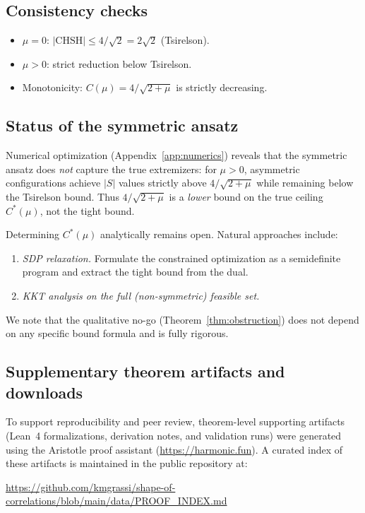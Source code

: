 \documentclass[11pt,a4paper]{article}
\theoremstyle{definition}
\theoremstyle{remark}
\newcommand{\CHSH}{\mathrm{CHSH}}
\begin{document}
\subsection{Consistency checks}

\begin{itemize}[nosep]
  \item $\mu = 0$: $|\CHSH| \le 4/\sqrt{2} = 2\sqrt{2}$ (Tsirelson).
  \item $\mu > 0$: strict reduction below Tsirelson.
  \item Monotonicity: $C(\mu) = 4/\sqrt{2+\mu}$ is strictly decreasing.
\end{itemize}

\subsection{Status of the symmetric ansatz}\label{app:paths}

Numerical optimization (Appendix~\ref{app:numerics}) reveals that the symmetric ansatz does \emph{not} capture the true extremizers: for $\mu > 0$, asymmetric configurations achieve $|S|$ values strictly above $4/\sqrt{2+\mu}$ while remaining below the Tsirelson bound. Thus $4/\sqrt{2+\mu}$ is a \emph{lower} bound on the true ceiling~$C^*(\mu)$, not the tight bound.

Determining $C^*(\mu)$ analytically remains open. Natural approaches include:
\begin{enumerate}[nosep]
  \item \emph{SDP relaxation.} Formulate the constrained optimization as a semidefinite program and extract the tight bound from the dual.
  \item \emph{KKT analysis on the full (non-symmetric) feasible set.}
\end{enumerate}
We note that the qualitative no-go (Theorem~\ref{thm:obstruction}) does not depend on any specific bound formula and is fully rigorous.

\subsection{Supplementary theorem artifacts and downloads}\label{app:artifacts}

To support reproducibility and peer review, theorem-level supporting artifacts (Lean~4 formalizations, derivation notes, and validation runs) were generated using the Aristotle proof assistant (\url{https://harmonic.fun}). A curated index of these artifacts is maintained in the public repository at:
\begin{center}
\url{https://github.com/kmgrassi/shape-of-correlations/blob/main/data/PROOF_INDEX.md}
\end{center}
\end{document}
